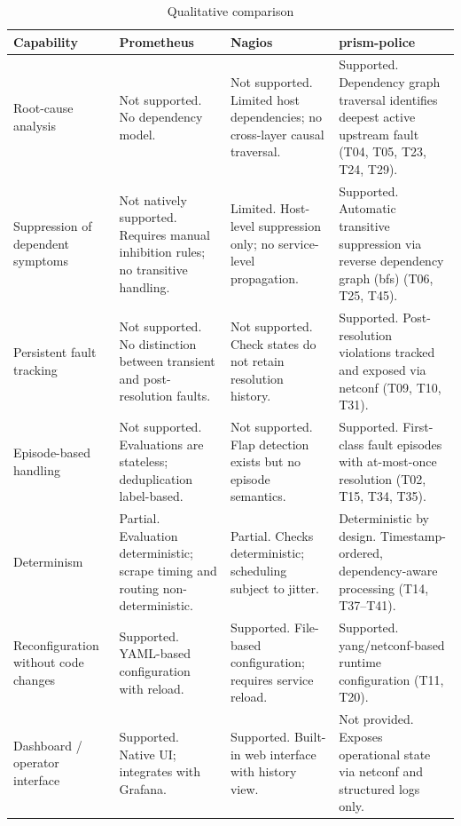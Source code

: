 \begin{table}[htbp]
\centering
\footnotesize
\caption{Qualitative comparison}
\label{tab:qualitative-comparison}
\begin{tabular}{p{2.8cm} p{3.5cm} p{3.5cm} p{4.8cm}}
\toprule
\textbf{Capability} & \textbf{Prometheus} & \textbf{Nagios} & \textbf{prism-police} \\
\midrule
Root-cause analysis & Not supported. No dependency model. & Not supported. Limited host dependencies; no cross-layer causal traversal. & Supported. Dependency graph traversal identifies deepest active upstream fault (T04, T05, T23, T24, T29). \\

Suppression of dependent symptoms & Not natively supported. Requires manual inhibition rules; no transitive handling. & Limited. Host-level suppression only; no service-level propagation. & Supported. Automatic transitive suppression via reverse dependency graph (\gls{bfs}) (T06, T25, T45). \\

Persistent fault tracking & Not supported. No distinction between transient and post-resolution faults. & Not supported. Check states do not retain resolution history. & Supported. Post-resolution violations tracked and exposed via \gls{netconf} (T09, T10, T31). \\

Episode-based handling & Not supported. Evaluations are stateless; deduplication label-based. & Not supported. Flap detection exists but no episode semantics. & Supported. First-class fault episodes with at-most-once resolution (T02, T15, T34, T35). \\

Determinism & Partial. Evaluation deterministic; scrape timing and routing non-deterministic. & Partial. Checks deterministic; scheduling subject to jitter. & Deterministic by design. Timestamp-ordered, dependency-aware processing (T14, T37--T41). \\

Reconfiguration without code changes & Supported. YAML-based configuration with reload. & Supported. File-based configuration; requires service reload. & Supported. \gls{yang}/\gls{netconf}-based runtime configuration (T11, T20). \\

Dashboard / operator interface & Supported. Native UI; integrates with Grafana. & Supported. Built-in web interface with history view. & Not provided. Exposes operational state via \gls{netconf} and structured logs only. \\
\bottomrule
\end{tabular}
\end{table}

